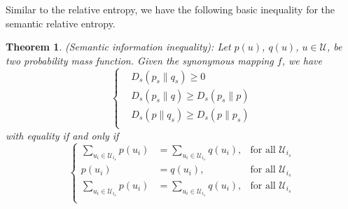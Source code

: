 \documentclass[12pt, draftclsnofoot,onecolumn]{IEEEtran}
\newtheorem{theorem}{\bf{Theorem}}
\begin{document}
Similar to the relative entropy, we have the following basic inequality for the semantic relative entropy.
\begin{theorem}\label{theorem3}
(Semantic information inequality): Let $p(u)$, $q(u)$, $u\in\mathcal{U}$, be two probability mass function. Given the synonymous mapping $f$, we have
\begin{equation}
\left\{\begin{aligned}
&D_s(p_s\|q_s)\geq 0\\
&D_s(p_s\|q)\geq D_s(p_s\|p)\\
&D_s(p\|q_s)\geq D_s(p\|p_s)\\
\end{aligned}
\right.
\end{equation}
with equality if and only if
\begin{equation}
\left\{\begin{aligned}
\sum_{u_i \in \mathcal{U}_{i_s}}p(u_i)&=\sum_{u_i \in \mathcal{U}_{i_s}}q(u_i), &\text{for all } \mathcal{U}_{i_s} \\
p(u_i)&=q(u_i), &\text{for all } \mathcal{U}_{i_s} \\
\sum_{u_i \in \mathcal{U}_{i_s}}p(u_i)&=\sum_{u_i \in \mathcal{U}_{i_s}}q(u_i), &\text{for all } \mathcal{U}_{i_s} \\
\end{aligned}\right.
\end{equation}
\end{theorem}
\end{document}
